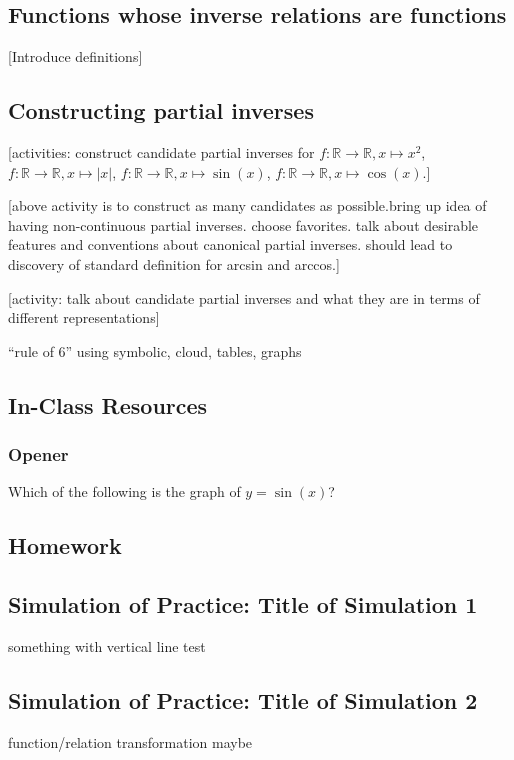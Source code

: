 \documentclass[11pt]{article}
\newcommand{\handout}{\subsubsection}
\newcommand\header[1]{\vspace*{4pt}\par {\large {\bf #1}}\par}
\newcommand{\R}{\mathbb{R}}
\theoremstyle{definition}
\begin{document}
\subsection{Functions whose inverse relations are functions}

[Introduce definitions] 

\subsection{Constructing partial inverses}

[activities: construct candidate partial inverses for $f:\R\to\R, x\mapsto x^2$,  $f:\R\to\R, x\mapsto |x|$,  $f:\R\to\R, x\mapsto \sin(x)$,  $f:\R\to\R, x\mapsto \cos(x)$.]

[above activity is to construct as many candidates as possible.bring up idea of having non-continuous partial inverses.  choose favorites.  talk about desirable features and conventions about canonical partial inverses. should lead to discovery of standard definition for arcsin and arccos.]

 [activity: talk about candidate partial inverses and what they are in terms of different representations]
 
 ``rule of 6'' using
symbolic, cloud, tables, graphs

\newpage \subsection{In-Class Resources}  
\handout{Opener}

Which of the following is the graph of $y=\sin(x)$? 

\newpage \subsection{Homework}

\newpage \subsection{Simulation of Practice: Title of Simulation 1}

something with vertical line test

\newpage \subsection{Simulation of Practice: Title of Simulation 2}

function/relation transformation maybe 
\end{document}
